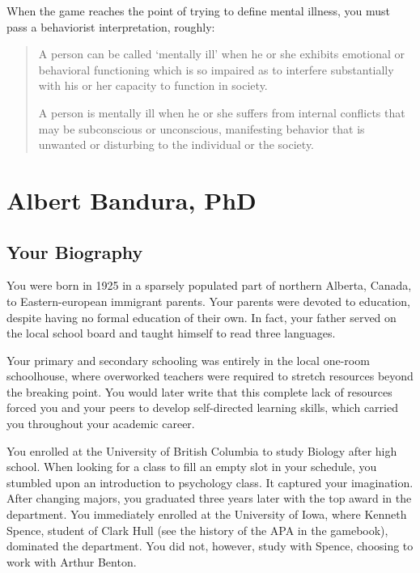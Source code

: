 \begin{refsection}
When the game reaches the point of trying to define mental illness, you must pass a behaviorist interpretation, roughly:

\begin{quote}

A person can be called `mentally ill' when he or she exhibits emotional or behavioral functioning which is so impaired as to interfere substantially with his or her capacity to function in society.
\begin{proposal}[Behaviorists]\label{proposal:behaviorists}A person is mentally ill when he or she suffers from internal conflicts that may be subconscious or unconscious, manifesting behavior that is unwanted or disturbing to the individual or the society.\end{proposal}
\end{quote}

\chapter{Albert Bandura, PhD}
\label{albertbanduraphd}

\section{Your Biography}
\label{yourbiography}

You were born in 1925 in a sparsely populated part of northern Alberta, Canada, to Eastern-european immigrant parents. Your parents were devoted to education, despite having no formal education of their own. In fact, your father served on the local school board and taught himself to read three languages.

Your primary and secondary schooling was entirely in the local one-room schoolhouse, where overworked teachers were required to stretch resources beyond the breaking point. You would later write that this complete lack of resources forced you and your peers to develop self-directed learning skills, which carried you throughout your academic career.

You enrolled at the University of British Columbia to study Biology after high school. When looking for a class to fill an empty slot in your schedule, you stumbled upon an introduction to psychology class. It captured your imagination. After changing majors, you graduated three years later with the top award in the department. You immediately enrolled at the University of Iowa, where Kenneth Spence, student of Clark Hull (see the history of the APA in the gamebook), dominated the department. You did not, however, study with Spence, choosing to work with Arthur Benton.


\end{refsection}
